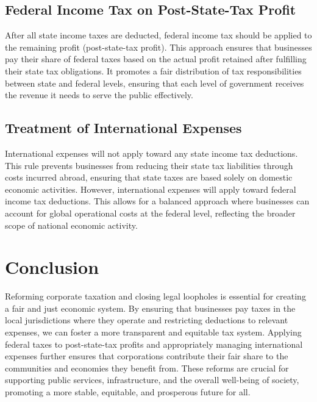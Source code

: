 \subsection*{Federal Income Tax on Post-State-Tax Profit}
After all state income taxes are deducted, federal income tax should be applied to the remaining profit (post-state-tax profit).
This approach ensures that businesses pay their share of federal taxes based on the actual profit retained after fulfilling their state tax obligations.
It promotes a fair distribution of tax responsibilities between state and federal levels, ensuring that each level of government receives the revenue it needs to serve the public effectively.

\subsection*{Treatment of International Expenses}
International expenses will not apply toward any state income tax deductions.
This rule prevents businesses from reducing their state tax liabilities through costs incurred abroad, ensuring that state taxes are based solely on domestic economic activities.
However, international expenses will apply toward federal income tax deductions.
This allows for a balanced approach where businesses can account for global operational costs at the federal level, reflecting the broader scope of national economic activity.

\section*{Conclusion}
Reforming corporate taxation and closing legal loopholes is essential for creating a fair and just economic system.
By ensuring that businesses pay taxes in the local jurisdictions where they operate and restricting deductions to relevant expenses, we can foster a more transparent and equitable tax system.
Applying federal taxes to post-state-tax profits and appropriately managing international expenses further ensures that corporations contribute their fair share to the communities and economies they benefit from.
These reforms are crucial for supporting public services, infrastructure, and the overall well-being of society, promoting a more stable, equitable, and prosperous future for all.

